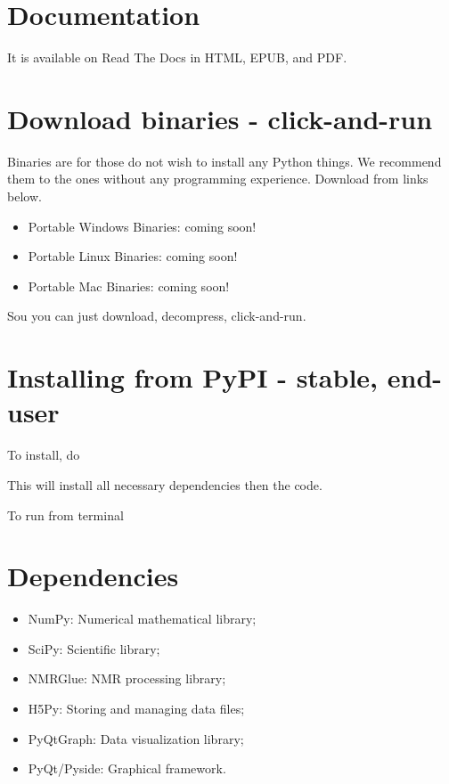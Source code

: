 \documentclass[a4paper,10pt,english]{sphinxmanual}
\begin{document}
\section{Documentation}
\label{\detokenize{readme:documentation}}
It is available on Read The Docs in HTML, EPUB, and PDF.


\section{Download binaries - click-and-run}
\label{\detokenize{readme:download-binaries-click-and-run}}
Binaries are for those do not wish to install any Python things.
We recommend them to the ones without any programming experience.
Download from links below.
\begin{itemize}
\item {} 
Portable Windows Binaries: coming soon!

\item {} 
Portable Linux Binaries: coming soon!

\item {} 
Portable Mac Binaries: coming soon!

\end{itemize}

Sou you can just download, decompress, click-and-run.


\section{Installing from PyPI - stable, end-user}
\label{\detokenize{readme:installing-from-pypi-stable-end-user}}
To install, do


This will install all necessary dependencies then the code.

To run from terminal



\section{Dependencies}
\label{\detokenize{readme:dependencies}}\begin{itemize}
\item {} 
NumPy: Numerical mathematical library;

\item {} 
SciPy: Scientific library;

\item {} 
NMRGlue: NMR processing library;

\item {} 
H5Py: Storing and managing data files;

\item {} 
PyQtGraph: Data visualization library;

\item {} 
PyQt/Pyside: Graphical framework.

\end{itemize}
\end{document}
